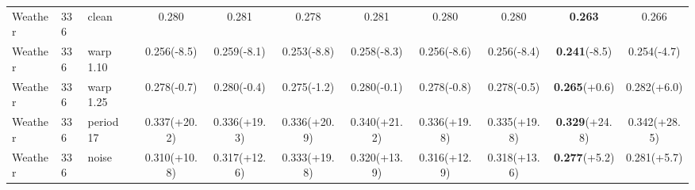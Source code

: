 \begin{tabular}{lllcccccccc}
\midrule
Weather & 336 & clean & 0.280 & 0.281 & 0.278 & 0.281 & 0.280 & 0.280 & \textbf{0.263} & 0.266 \\
Weather & 336 & warp 1.10 & 0.256\tiny{(-8.5)} & 0.259\tiny{(-8.1)} & 0.253\tiny{(-8.8)} & 0.258\tiny{(-8.3)} & 0.256\tiny{(-8.6)} & 0.256\tiny{(-8.4)} & \textbf{0.241}\tiny{(-8.5)} & 0.254\tiny{(-4.7)} \\
Weather & 336 & warp 1.25 & 0.278\tiny{(-0.7)} & 0.280\tiny{(-0.4)} & 0.275\tiny{(-1.2)} & 0.280\tiny{(-0.1)} & 0.278\tiny{(-0.8)} & 0.278\tiny{(-0.5)} & \textbf{0.265}\tiny{(+0.6)} & 0.282\tiny{(+6.0)} \\
Weather & 336 & period 17 & 0.337\tiny{(+20.2)} & 0.336\tiny{(+19.3)} & 0.336\tiny{(+20.9)} & 0.340\tiny{(+21.2)} & 0.336\tiny{(+19.8)} & 0.335\tiny{(+19.8)} & \textbf{0.329}\tiny{(+24.8)} & 0.342\tiny{(+28.5)} \\
Weather & 336 & noise & 0.310\tiny{(+10.8)} & 0.317\tiny{(+12.6)} & 0.333\tiny{(+19.8)} & 0.320\tiny{(+13.9)} & 0.316\tiny{(+12.9)} & 0.318\tiny{(+13.6)} & \textbf{0.277}\tiny{(+5.2)} & 0.281\tiny{(+5.7)} \\
\bottomrule
\end{tabular}
